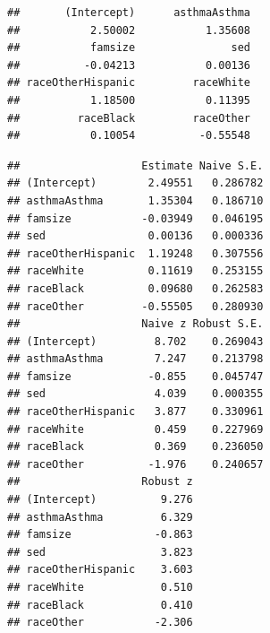 \documentclass[]{tufte-book}
\newenvironment{Shaded}{}{}
\newcommand{\KeywordTok}[1]{\textcolor[rgb]{0.00,0.44,0.13}{\textbf{#1}}}
\newcommand{\DataTypeTok}[1]{\textcolor[rgb]{0.56,0.13,0.00}{#1}}
\newcommand{\StringTok}[1]{\textcolor[rgb]{0.25,0.44,0.63}{#1}}
\newcommand{\OperatorTok}[1]{\textcolor[rgb]{0.40,0.40,0.40}{#1}}
\newcommand{\NormalTok}[1]{#1}
\theoremstyle{definition}
\theoremstyle{definition}
\theoremstyle{remark}
\begin{document}
\begin{verbatim}
##       (Intercept)      asthmaAsthma 
##           2.50002           1.35608 
##           famsize               sed 
##          -0.04213           0.00136 
## raceOtherHispanic         raceWhite 
##           1.18500           0.11395 
##         raceBlack         raceOther 
##           0.10054          -0.55548
\end{verbatim}

\begin{Shaded}
\end{Shaded}

\begin{verbatim}
##                   Estimate Naive S.E.
## (Intercept)        2.49551   0.286782
## asthmaAsthma       1.35304   0.186710
## famsize           -0.03949   0.046195
## sed                0.00136   0.000336
## raceOtherHispanic  1.19248   0.307556
## raceWhite          0.11619   0.253155
## raceBlack          0.09680   0.262583
## raceOther         -0.55505   0.280930
##                   Naive z Robust S.E.
## (Intercept)         8.702    0.269043
## asthmaAsthma        7.247    0.213798
## famsize            -0.855    0.045747
## sed                 4.039    0.000355
## raceOtherHispanic   3.877    0.330961
## raceWhite           0.459    0.227969
## raceBlack           0.369    0.236050
## raceOther          -1.976    0.240657
##                   Robust z
## (Intercept)          9.276
## asthmaAsthma         6.329
## famsize             -0.863
## sed                  3.823
## raceOtherHispanic    3.603
## raceWhite            0.510
## raceBlack            0.410
## raceOther           -2.306
\end{verbatim}

\begin{Shaded}
\end{Shaded}
\end{document}
